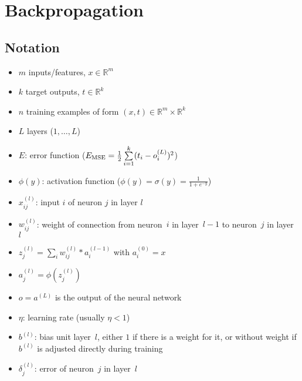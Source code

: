 \section{Backpropagation}\label{sec:backpropagation}

\subsection{Notation}
\begin{itemize}
\item $m$ inputs/features, $x \in \mathbb{R}^m$
\item $k$ target outputs, $t \in \mathbb{R}^k$
\item $n$ training examples of form $(x, t) \in \mathbb{R}^m \times \mathbb{R}^k$
\item $L$ layers ($1,\dots,L$)
\item $E$: error function (\eg $E_{\text{MSE}} = \frac{1}{2} \sum\limits_{i=1}^k (t_i - o_i^{(L)})^2$)
\item $\phi(y)$: activation function (\eg $\phi(y) = \sigma(y) = \frac{1}{1 + e^{-y}}$)
\item $x_{ij}^{(l)}$: input $i$ of neuron $j$ in layer $l$
\item $w_{ij}^{(l)}$: weight of connection from neuron~$i$ in layer~$l-1$ to neuron~$j$ in layer~$l$
\item $z_j^{(l)} = \sum\limits_i w_{ij}^{(l)} * a_i^{(l-1)}$ with $a_i^{(0)} = x$
\item $a_j^{(l)} = \phi(z_j^{(l)})$
\item $o = a^{(L)}$ is the output of the neural network
\item $\eta$: learning rate (usually $\eta < 1$)
\item $b^{(l)}$: bias unit layer~$l$, either $1$ if there is a weight for it, or without weight if $b^{(l)}$ is adjusted directly during training
\item $\delta_j^{(l)}$: error of neuron~$j$ in layer~$l$
\end{itemize}

